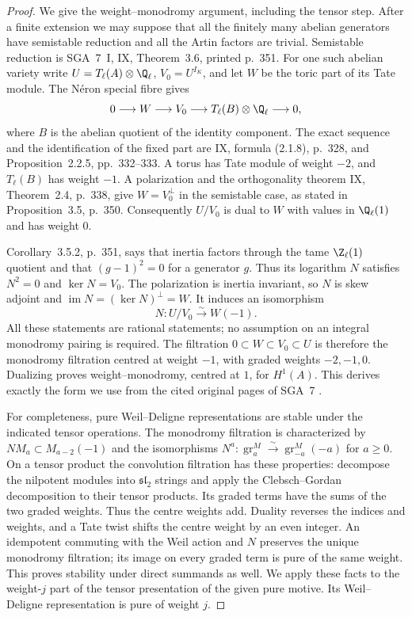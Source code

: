 \begin{proof}
We give the weight--monodromy argument, including the tensor step.
After a finite extension we may suppose that all the finitely many
abelian generators have semistable reduction and all the Artin factors
are trivial.  Semistable reduction is SGA~7~I, IX, Theorem~3.6, printed
p.~351.  For one such abelian variety write
$U=T_\ell(A)\otimes\Q_\ell$, $V_0=U^{I_K}$, and let $W$ be the
toric part of its Tate module.  The N\'eron special fibre gives
\[
 0\longrightarrow W\longrightarrow V_0
       \longrightarrow T_\ell(B)\otimes\Q_\ell\longrightarrow0,
\]
where $B$ is the abelian quotient of the identity component.  The exact
sequence and the identification of the fixed part are IX, formula
(2.1.8), p.~328, and Proposition~2.2.5, pp.~332--333.  A torus has Tate
module of weight $-2$, and $T_\ell(B)$ has weight $-1$.  A polarization
and the orthogonality theorem IX, Theorem~2.4, p.~338, give
$W=V_0^\perp$ in the semistable case, as stated in Proposition~3.5,
p.~350.  Consequently $U/V_0$ is dual to $W$ with values in
$\Q_\ell(1)$ and has weight $0$.

Corollary~3.5.2, p.~351, says that inertia factors through the tame
$\Z_\ell(1)$ quotient and that $(g-1)^2=0$ for a generator $g$.
Thus its logarithm $N$ satisfies $N^2=0$ and $\ker N=V_0$.
The polarization is inertia invariant, so $N$ is skew adjoint and
$\operatorname{im}N=(\ker N)^\perp=W$.  It induces an isomorphism
\[
 N:U/V_0\xrightarrow{\sim}W(-1).
\]
All these statements are rational statements; no assumption on an
integral monodromy pairing is required.  The filtration
$0\subset W\subset V_0\subset U$ is therefore the monodromy
filtration centred at weight $-1$, with graded weights $-2,-1,0$.
Dualizing proves weight--monodromy, centred at $1$, for $H^1(A)$.
This derives exactly the form we use from the cited original pages
of SGA~7 \citep{c_sga7}.

For completeness, pure Weil--Deligne representations are stable under
the indicated tensor operations.  The monodromy filtration is
characterized by $NM_a\subset M_{a-2}(-1)$ and the isomorphisms
$N^a:\operatorname{gr}_a^M\xrightarrow{\sim}
\operatorname{gr}_{-a}^M(-a)$ for $a\geq0$.  On a tensor product
the convolution filtration has these properties: decompose the
nilpotent modules into $\mathfrak{sl}_2$ strings and apply the
Clebsch--Gordan decomposition to their tensor products.  Its graded
terms have the sums of the two graded weights.  Thus the centre
weights add.  Duality reverses the indices and weights, and a Tate
twist shifts the centre weight by an even integer.  An idempotent
commuting with the Weil action and $N$ preserves the unique
monodromy filtration; its image on every graded term is pure of the
same weight.  This proves stability under direct summands as well.
We apply these facts to the weight-$j$ part of the tensor presentation
of the given pure motive.  Its Weil--Deligne representation is pure
of weight $j$.


\end{proof}
